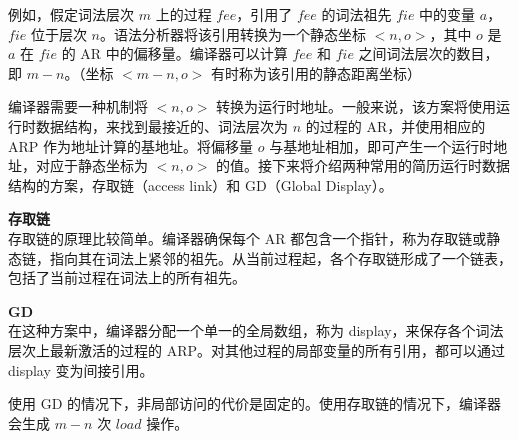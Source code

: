 \documentclass[12pt]{article}
\begin{document}
例如，假定词法层次 $m$ 上的过程 $fee$，引用了 $fee$ 的词法祖先 $fie$ 中的变量 $a$，$fie$ 位于层次 $n$。语法分析器将该引用转换为一个静态坐标 $<n, o>$，其中 $o$ 是 $a$ 在 $fie$ 的 AR 中的偏移量。编译器可以计算 $fee$ 和 $fie$ 之间词法层次的数目，即 $m-n$。（坐标 $<m-n, o>$ 有时称为该引用的静态距离坐标）

编译器需要一种机制将 $<n, o>$ 转换为运行时地址。一般来说，该方案将使用运行时数据结构，来找到最接近的、词法层次为 $n$ 的过程的 AR，并使用相应的 ARP 作为地址计算的基地址。将偏移量 $o$ 与基地址相加，即可产生一个运行时地址，对应于静态坐标为 $<n,  o>$ 的值。接下来将介绍两种常用的简历运行时数据结构的方案，存取链（access link）和 GD（Global Display）。

\textbf{存取链}\\
存取链的原理比较简单。编译器确保每个 AR 都包含一个指针，称为存取链或静态链，指向其在词法上紧邻的祖先。从当前过程起，各个存取链形成了一个链表，包括了当前过程在词法上的所有祖先。

\textbf{GD}\\
在这种方案中，编译器分配一个单一的全局数组，称为 display，来保存各个词法层次上最新激活的过程的 ARP。对其他过程的局部变量的所有引用，都可以通过 display 变为间接引用。

使用  GD 的情况下，非局部访问的代价是固定的。使用存取链的情况下，编译器会生成 $m-n$ 次 $load$ 操作。
\end{document}
